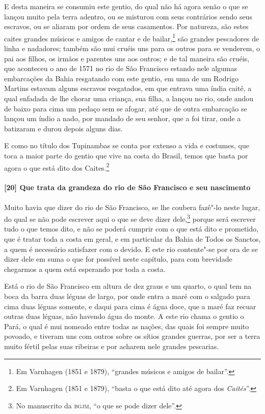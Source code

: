 \begin{linenumbers}
E desta maneira se consumiu este gentio, do qual não há agora senão o que se lançou muito
pela terra adentro, ou se misturou com seus contrários sendo seus escravos, ou se aliaram
por ordem de seus casamentos. Por natureza, são estes caites grandes músicos e amigos de
cantar e de bailar,\footnote{ Em Varnhagen (1851 e 1879), ``grandes músicos e amigos de
bailar''.} são grandes pescadores de linha e nadadores; também são mui cruéis uns para os
outros para se venderem, o pai aos filhos, os irmãos e parentes uns aos outros; e de tal
maneira são cruéis, que aconteceu o ano de 1571 no rio de São Francisco estando nele
algumas embarcações da Bahia resgatando com este gentio, em uma de um Rodrigo Martins
estavam alguns escravos resgatados, em que entrava uma índia caité, a qual enfadada de lhe
chorar uma criança, sua filha, a lançou no rio, onde andou de baixo para cima um pedaço
sem se afogar, até que de outra embarcação se lançou um índio a nado, por mandado de seu
senhor, que a foi tirar, onde a batizaram e durou depois alguns dias.

E como no título dos Tupinambas se conta por extenso a vida e costumes, que toca a maior
parte do gentio que vive na costa do Brasil, temos que basta por agora o que está dito dos
Caites.\footnote{ Em Varnhagen (1851 e 1879), ``basta o que está dito até agora dos
\textit{Caités}''.}

\paragraph{[20] Que trata da grandeza do rio de São Francisco e seu nascimento} \quad
Muito havia que dizer do rio de São Francisco, se lhe coubera fazê"-lo neste lugar, do qual
se não pode escrever aqui o que se deve dizer dele,\footnote{ No manuscrito da
\textsc{bgjm}, ``o que se pode dizer dele''.} porque será escrever tudo o que temos dito,
e não se poderá cumprir com o que está dito e prometido, que é tratar toda a costa em
geral, e em particular da Bahia de Todos os Sanctos, a quem é necessário satisfazer com o
devido. E este rio contente"-se por ora de se dizer dele em suma o que for possível neste
capítulo, para com brevidade chegarmos a quem está esperando por toda a costa.

Está o rio de São Francisco em altura de dez graus e um quarto, o qual tem na boca da
barra duas léguas de largo, por onde entra a maré com o salgado para cima duas léguas
somente, e daqui para cima é água doce, que a maré faz recuar outras duas léguas, não
havendo água do monte. A este rio chama o gentio o Pará, o qual é mui nomeado entre todas
as nações, das quais foi sempre muito povoado, e tiveram uns com outros sobre os sítios
grandes guerras, por ser a terra muito fértil pelas suas ribeiras e por acharem nele
grandes pescarias.


\end{linenumbers}
